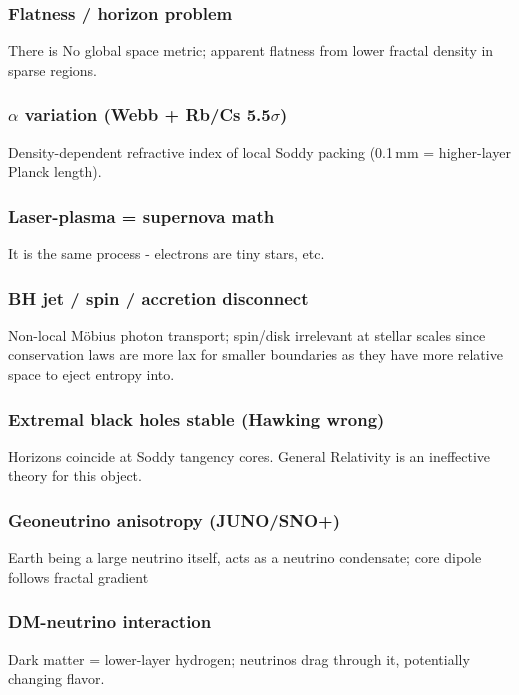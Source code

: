 \documentclass[11pt,a4paper]{article}
\begin{document}
    \subsubsection{
     Flatness / horizon problem 
     } 
     There is No global space metric; apparent flatness from lower fractal density in sparse regions.

    \subsubsection{
     $\alpha$ variation (Webb + Rb/Cs 5.5$\sigma$)
     } 
     Density-dependent refractive index of local Soddy packing (0.1\,mm = higher-layer Planck length).

    \subsubsection{
     Laser-plasma = supernova math
     }
     It is the same process - electrons are tiny stars, etc.

    \subsubsection{
      BH jet / spin / accretion disconnect 
     } 
     Non-local Möbius photon transport; spin/disk irrelevant at stellar scales since conservation laws are more lax for smaller boundaries as they have more relative space to eject entropy into. 

    \subsubsection{
      Extremal black holes stable (Hawking wrong)
     } 

     Horizons coincide at Soddy tangency cores. General Relativity is an ineffective theory for this object.

    \subsubsection{
     Geoneutrino anisotropy (JUNO/SNO+) 
     }

      Earth being a large neutrino itself, acts as a neutrino condensate; core dipole follows fractal gradient

    \subsubsection{
     DM-neutrino interaction 
     }
      Dark matter = lower-layer hydrogen; neutrinos drag through it, potentially changing flavor. 
\end{document}
